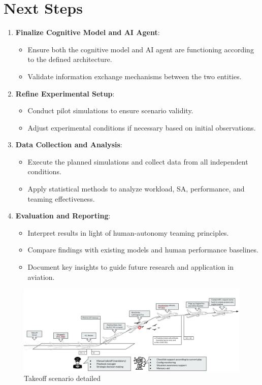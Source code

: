 \documentclass[12pt,a4paper]{article} %
\begin{document}
	\section{Next Steps}
	\begin{enumerate}
	\item \textbf{Finalize Cognitive Model and AI Agent}:
	\begin{itemize}
	\item Ensure both the cognitive model and AI agent are functioning according to the defined architecture.
	\item Validate information exchange mechanisms between the two entities.
	\end{itemize}
	\item \textbf{Refine Experimental Setup}:
	\begin{itemize}
	\item Conduct pilot simulations to ensure scenario validity.
	\item Adjust experimental conditions if necessary based on initial observations.
	\end{itemize}
	\item \textbf{Data Collection and Analysis}:
	\begin{itemize}
	\item Execute the planned simulations and collect data from all independent conditions.
	\item Apply statistical methods to analyze workload, SA, performance, and teaming effectiveness.
	\end{itemize}
	\item \textbf{Evaluation and Reporting}:
	\begin{itemize}
	\item Interpret results in light of human-autonomy teaming principles.
	\item Compare findings with existing models and human performance baselines.
	\item Document key insights to guide future research and application in aviation.
	\end{itemize}
	\end{enumerate}
	\begin{figure}[h!]
		\centering
		\includegraphics[width=1.0\textwidth]{./images/scenario_detailed.png}
		\caption{Takeoff scenario detailed}
		\label{fig:scenario_detailed}
	\end{figure}
	
\end{document}
